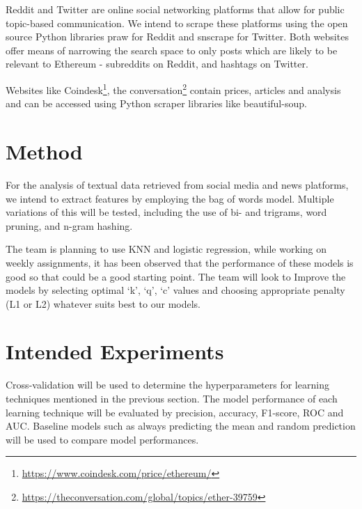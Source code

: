 \documentclass{article}
\begin{document}
Reddit and Twitter are online social networking platforms that allow for public topic-based communication. We intend to scrape these platforms using the open source Python libraries praw for Reddit and snscrape for Twitter. Both websites offer means of narrowing the search space to only posts which are likely to be relevant to Ethereum - subreddits on Reddit, and hashtags on Twitter.

Websites like Coindesk\footnote{\url{https://www.coindesk.com/price/ethereum/}}, the conversation\footnote{\url{https://theconversation.com/global/topics/ether-39759}} contain prices, articles and analysis and can be accessed using Python scraper libraries like beautiful-soup.



\section{Method}

For the analysis of textual data retrieved from social media and news platforms, we intend to extract features by employing the bag of words model. Multiple variations of this will be tested, including the use of bi- and trigrams, word pruning, and n-gram hashing.

The team is planning to use KNN and logistic regression, while working on weekly assignments, it has been observed that the performance of these models is good so that could be a good starting point. The team will look to Improve the models by selecting optimal ‘k’, ‘q’, ‘c’ values and choosing appropriate penalty (L1 or L2) whatever suits best to our models.

\section{Intended Experiments}

Cross-validation will be used to determine the hyperparameters for learning techniques mentioned in the previous section. The model performance of each learning technique will be evaluated by precision, accuracy, F1-score, ROC and AUC. Baseline models such as always predicting the mean and random prediction will be used to compare model performances.
\end{document}
